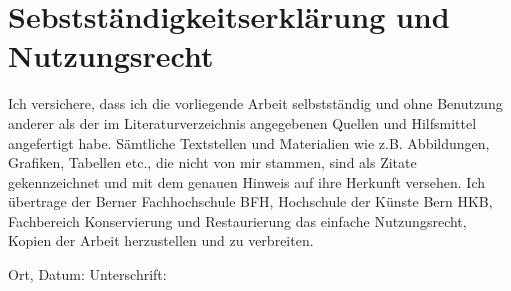 
\chapter{Sebstständigkeitserklärung und Nutzungsrecht}

Ich versichere, dass ich die vorliegende Arbeit selbstständig und ohne Benutzung anderer als der im Literaturverzeichnis angegebenen Quellen und Hilfsmittel angefertigt habe. Sämtliche Textstellen und Materialien wie z.B. Abbildungen, Grafiken, Tabellen etc., die nicht von mir stammen, sind als Zitate gekennzeichnet und mit dem genauen Hinweis auf ihre Herkunft versehen.
Ich übertrage der Berner Fachhochschule BFH, Hochschule der Künste Bern HKB, Fachbereich Konservierung und Restaurierung das einfache Nutzungsrecht, Kopien der Arbeit herzustellen und zu verbreiten.


Ort, Datum: Unterschrift: